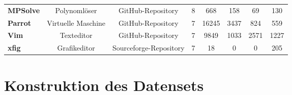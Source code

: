 \begin{table}[H]
{\begin{tabular}{lccccccc}
\multicolumn{1}{l|}{\textbf{MPSolve}}  & Polynomlöser         & GitHub-Repository      & 8                   & 668                & 158                  & 69                          & 130                 \\
\multicolumn{1}{l|}{\textbf{Parrot}}   & Virtuelle Maschine   & GitHub-Repository      & 7                   & 16245              & 3437                 & 824                         & 559                 \\
\multicolumn{1}{l|}{\textbf{Vim}}      & Texteditor           & GitHub-Repository      & 7                   & 9849               & 1033                 & 2571                        & 1227                \\
\multicolumn{1}{l|}{\textbf{xfig}}     & Grafikeditor         & Sourceforge-Repository & 7                   & 18                 & 0                    & 0                           & 205                
\end{tabular}%
}
\end{table}

\section{Konstruktion des Datensets}


